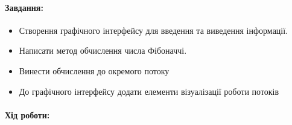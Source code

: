 \paragraph{Завдання:}
\begin{itemize}
	\item Створення графічного інтерфейсу для введення та виведення інформації.
	\item Написати метод обчислення числа Фібоначчі.
	\item Винести обчислення до окремого потоку
	\item До графічного інтерфейсу додати елементи візуалізації роботи потоків
\end{itemize}

\paragraph{Хід роботи:}
